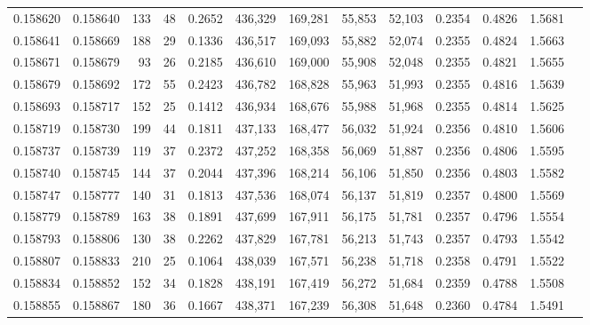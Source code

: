 \begin{tabular}{rrrrrrrrrrrrr}
0.158620 & 0.158640 &   133 &  48 &                                     0.2652 & 436,329 & 169,281 &  55,853 &  52,103 & 0.2354 & 0.4826 & 1.5681 \\
0.158641 & 0.158669 &   188 &  29 &                                     0.1336 & 436,517 & 169,093 &  55,882 &  52,074 & 0.2355 & 0.4824 & 1.5663 \\
0.158671 & 0.158679 &    93 &  26 &                                     0.2185 & 436,610 & 169,000 &  55,908 &  52,048 & 0.2355 & 0.4821 & 1.5655 \\
0.158679 & 0.158692 &   172 &  55 &                                     0.2423 & 436,782 & 168,828 &  55,963 &  51,993 & 0.2355 & 0.4816 & 1.5639 \\
0.158693 & 0.158717 &   152 &  25 &                                     0.1412 & 436,934 & 168,676 &  55,988 &  51,968 & 0.2355 & 0.4814 & 1.5625 \\
0.158719 & 0.158730 &   199 &  44 &                                     0.1811 & 437,133 & 168,477 &  56,032 &  51,924 & 0.2356 & 0.4810 & 1.5606 \\
0.158737 & 0.158739 &   119 &  37 &                                     0.2372 & 437,252 & 168,358 &  56,069 &  51,887 & 0.2356 & 0.4806 & 1.5595 \\
0.158740 & 0.158745 &   144 &  37 &                                     0.2044 & 437,396 & 168,214 &  56,106 &  51,850 & 0.2356 & 0.4803 & 1.5582 \\
0.158747 & 0.158777 &   140 &  31 &                                     0.1813 & 437,536 & 168,074 &  56,137 &  51,819 & 0.2357 & 0.4800 & 1.5569 \\
0.158779 & 0.158789 &   163 &  38 &                                     0.1891 & 437,699 & 167,911 &  56,175 &  51,781 & 0.2357 & 0.4796 & 1.5554 \\
0.158793 & 0.158806 &   130 &  38 &                                     0.2262 & 437,829 & 167,781 &  56,213 &  51,743 & 0.2357 & 0.4793 & 1.5542 \\
0.158807 & 0.158833 &   210 &  25 &                                     0.1064 & 438,039 & 167,571 &  56,238 &  51,718 & 0.2358 & 0.4791 & 1.5522 \\
0.158834 & 0.158852 &   152 &  34 &                                     0.1828 & 438,191 & 167,419 &  56,272 &  51,684 & 0.2359 & 0.4788 & 1.5508 \\
0.158855 & 0.158867 &   180 &  36 &                                     0.1667 & 438,371 & 167,239 &  56,308 &  51,648 & 0.2360 & 0.4784 & 1.5491 \\

\end{tabular}
